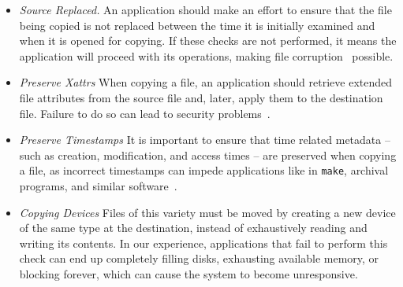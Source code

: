 \begin{itemize}
    \item{{\it Source Replaced.} An application should make an effort
to ensure that the file being copied is not replaced between the time it is initially examined and when it is opened for copying.
If these checks are not performed, it
means the application will proceed with its operations,
        making file corruption~\cite{PythonShutilBug}} possible.

    \item{{\it Preserve Xattrs}
When copying a file,
an application should retrieve extended file attributes from the source
file and, later, apply them to the destination file.  Failure to do so can lead to security problems~\cite{AppleCodeSigning}.}

    \item{{\it Preserve Timestamps}  It is important to ensure
that time related metadata --
such as creation, modification, and access times  --
are preserved when copying a file, as
incorrect timestamps can impede applications like in {\tt make},
        archival programs, and similar software~\cite{NautilusTimestamps,
        SudoTimestamp}.}

    \item{{\it Copying Devices}
Files of this variety must be moved
by creating a new device of the same type at the destination,
instead of exhaustively reading and writing its contents.
In our experience, applications that fail to perform this check
can end up completely filling disks, exhausting available memory,
        or blocking forever, which can cause the system to become unresponsive.}

\end{itemize}

